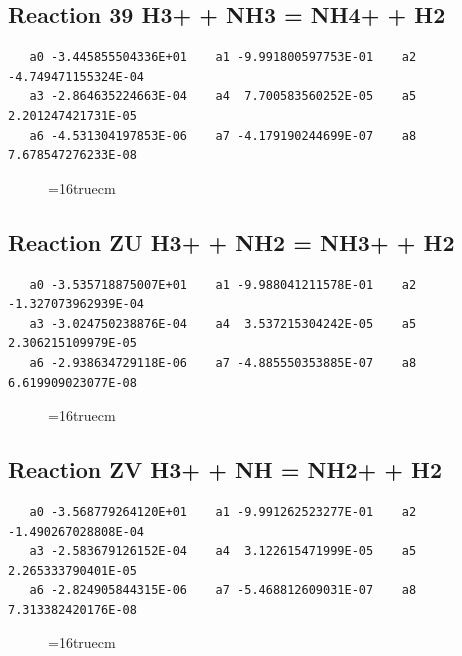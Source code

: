 \documentclass[12pt,dvipdfm]{article}
\begin{document}
\subsection{
Reaction 39 H3+ + NH3 = NH4+ + H2}
\begin{small}\begin{verbatim}
   a0 -3.445855504336E+01    a1 -9.991800597753E-01    a2 -4.749471155324E-04
   a3 -2.864635224663E-04    a4  7.700583560252E-05    a5  2.201247421731E-05
   a6 -4.531304197853E-06    a7 -4.179190244699E-07    a8  7.678547276233E-08
   \end{verbatim}\end{small}
\begin{figure}[h!] \label{n2rates}
\epsfxsize=16truecm
\end{figure}
\newpage

\subsection{
Reaction ZU H3+ + NH2 = NH3+ + H2}
\begin{small}\begin{verbatim}
   a0 -3.535718875007E+01    a1 -9.988041211578E-01    a2 -1.327073962939E-04
   a3 -3.024750238876E-04    a4  3.537215304242E-05    a5  2.306215109979E-05
   a6 -2.938634729118E-06    a7 -4.885550353885E-07    a8  6.619909023077E-08
   \end{verbatim}\end{small}
\begin{figure}[h!] \label{n2rates}
\epsfxsize=16truecm
\end{figure}
\newpage

\subsection{
Reaction ZV H3+ + NH = NH2+ + H2}
\begin{small}\begin{verbatim}
   a0 -3.568779264120E+01    a1 -9.991262523277E-01    a2 -1.490267028808E-04
   a3 -2.583679126152E-04    a4  3.122615471999E-05    a5  2.265333790401E-05
   a6 -2.824905844315E-06    a7 -5.468812609031E-07    a8  7.313382420176E-08
   \end{verbatim}\end{small}
\begin{figure}[h!] \label{n2rates}
\epsfxsize=16truecm
\end{figure}
\newpage
\end{document}
